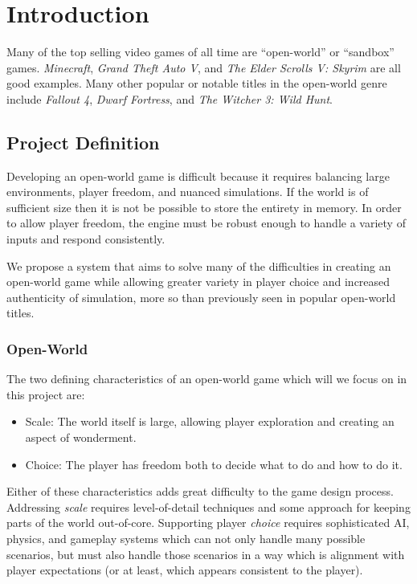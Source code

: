 
\chapter{Introduction}


Many of the top selling video games of all time are ``open-world'' or ``sandbox'' games. {\em Minecraft}, {\em Grand Theft Auto V}, and {\em The Elder Scrolls V: Skyrim} are all good examples. Many other popular or notable titles in the open-world genre include {\em Fallout 4}, {\em Dwarf Fortress}, and {\em The Witcher 3: Wild Hunt}.

\section{Project Definition}

Developing an open-world game is difficult because it requires balancing large environments, player freedom, and nuanced simulations. If the world is of sufficient size then it is not be possible to store the entirety in memory. In order to allow player freedom, the engine must be robust enough to handle a variety of inputs and respond consistently.

We propose a system that aims to solve many of the difficulties in creating an open-world game while allowing greater variety in player choice and increased authenticity of simulation, more so than previously seen in popular open-world titles.

\subsection{Open-World}

The two defining characteristics of an open-world game which will we focus on in this project are:

\begin{itemize}
  \item Scale: The world itself is large, allowing player exploration and creating an aspect of wonderment.
  \item Choice: The player has freedom both to decide what to do and how to do it.
\end{itemize}

Either of these characteristics adds great difficulty to the game design process. Addressing {\em scale} requires level-of-detail techniques and some approach for keeping parts of the world out-of-core. Supporting player {\em choice} requires sophisticated AI, physics, and gameplay systems which can not only handle many possible scenarios, but must also handle those scenarios in a way which is alignment with player expectations (or at least, which appears consistent to the player).

